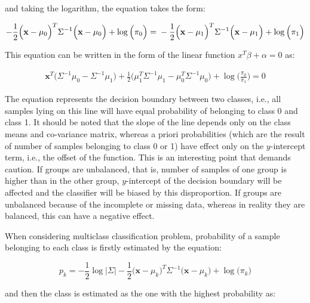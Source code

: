 \documentclass{article}
\begin{document}
\noindent
and taking the logarithm, the equation takes the form: 

\begin{equation} 
-\frac{1}{2}  \Big(\mathbf{x}-\mu_0\Big)^T  \Sigma^{-1} \Big(\mathbf{x}-\mu_0\Big) +  \log{\Big(\pi_0\Big)}= \\
-\frac{1}{2}  \Big(\mathbf{x}-\mu_1\Big)^T  \Sigma^{-1} \Big(\mathbf{x}-\mu_1\Big) +  \log{\Big(\pi_1\Big)}
\end{equation}

This equation can be written in the form of the linear function $x^T\beta + \alpha = 0$ as:

\begin{equation} 
\begin{split}
\mathbf{x}^T\Big(\Sigma^{-1} \mu_0 - \Sigma^{-1} \mu_1\Big) + \frac{1}{2} \Big(\mu_1^T \Sigma^{-1}\mu_1 - \mu_0^T \Sigma^{-1}\mu_0\Big)
+ \log\Big( \frac{\pi_0}{\pi_1}  \Big) = 0
\end{split}
\end{equation}

The equation represents the decision boundary between two classes, i.e., all samples lying on this line will have equal probability of belonging to class 0 and class 1. It should be noted that the slope of the line depends only on the class means and co-variance matrix, whereas a priori probabilities (which are the result of number of samples belonging to class 0 or 1) have effect only on the $y$-intercept term, i.e., the offset of the function. This is an interesting point that demands caution. If groups are unbalanced, that is, number of samples of one group is higher than in the other group, $y$-intercept of the decision boundary will be affected and the classifier will be biased by this disproportion. If groups are unbalanced because of the incomplete or missing data, whereas in reality they are balanced, this can have a negative effect.

When considering multiclass classification problem, probability of a sample belonging to each class is firstly estimated by the equation:

\begin{equation}
p_k = -\frac{1}{2} \log \big\vert \Sigma \big\vert - \frac{1}{2}  \Big(\mathbf{x}-\mu_k\Big)^T  \Sigma^{-1} \Big(\mathbf{x}-\mu_k\Big) +  \log{\Big(\pi_k\Big)}
\end{equation}

\noindent and then the class is estimated as the one with the highest probability as:
\end{document}
